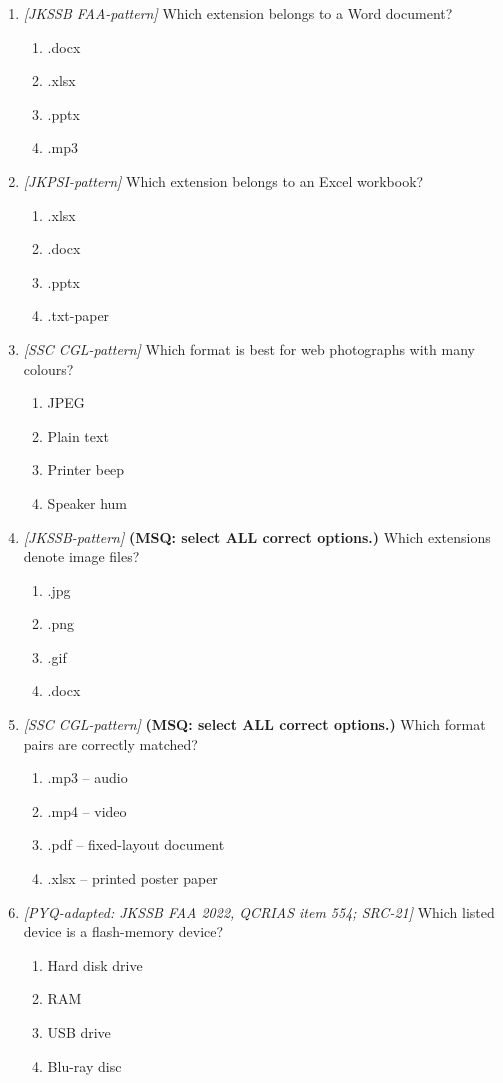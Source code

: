 \begin{enumerate}[label=\textbf{Q\arabic*.}, leftmargin=*]
\item \textit{[JKSSB FAA-pattern]} Which extension belongs to a Word document?
  \begin{enumerate}[label=\Alph*.]
    \item .docx
    \item .xlsx
    \item .pptx
    \item .mp3
  \end{enumerate}
\item \textit{[JKPSI-pattern]} Which extension belongs to an Excel workbook?
  \begin{enumerate}[label=\Alph*.]
    \item .xlsx
    \item .docx
    \item .pptx
    \item .txt-paper
  \end{enumerate}
\item \textit{[SSC CGL-pattern]} Which format is best for web photographs with many colours?
  \begin{enumerate}[label=\Alph*.]
    \item JPEG
    \item Plain text
    \item Printer beep
    \item Speaker hum
  \end{enumerate}
\item \textit{[JKSSB-pattern]} \textbf{(MSQ: select ALL correct options.)} Which extensions denote image files?
  \begin{enumerate}[label=\Alph*.]
    \item .jpg
    \item .png
    \item .gif
    \item .docx
  \end{enumerate}
\item \textit{[SSC CGL-pattern]} \textbf{(MSQ: select ALL correct options.)} Which format pairs are correctly matched?
  \begin{enumerate}[label=\Alph*.]
    \item .mp3 -- audio
    \item .mp4 -- video
    \item .pdf -- fixed-layout document
    \item .xlsx -- printed poster paper
  \end{enumerate}
\item \textit{[PYQ-adapted: JKSSB FAA 2022, QCRIAS item 554; SRC-21]} Which listed device is a flash-memory device?
  \begin{enumerate}[label=\Alph*.]
\item Hard disk drive
   \item RAM
   \item USB drive
   \item Blu-ray disc
  \end{enumerate}


\end{enumerate}
